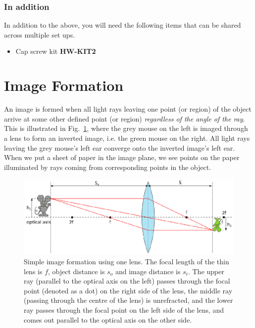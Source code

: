 \documentclass[a4paper]{report}
\begin{document}
\subsubsection{In addition}
In addition to the above, you will need the following items that can be shared across multiple set ups.
\begin{itemize}
\item Cap screw kit \textbf{HW-KIT2}
\end{itemize}


\clearpage

\section{Image Formation}
An image is formed when all light rays leaving one point (or region) of the object arrive at some other defined point (or region) \textit{regardless of the angle of the ray}. 
This is illustrated in Fig.~\ref{fig:imageforming}, where the grey mouse on the left is imaged through a lens to form an inverted image, i.e. the green mouse on the right. 
All light rays leaving the grey mouse’s left ear converge onto the inverted image's left ear. 
When we put a sheet of paper in the image plane, we see points on the paper illuminated by rays coming from corresponding points in the object. 



\begin{figure}[h]
\center
\includegraphics{image_forming_basics.eps}
\caption{Simple image formation using one lens. 
The focal length of the thin lens is $f$, object distance is $s_o$ and image distance is $s_i$. 
The upper ray (parallel to the optical axis on the left) passes through the focal point (denoted as a dot) on the right side of the lens, the middle ray (passing through the centre of the lens) is unrefracted, and the lower ray passes through the focal point on the left side of the lens, and comes out parallel to the optical axis on the other side. 
}
\label{fig:imageforming}
\end{figure}
\end{document}

